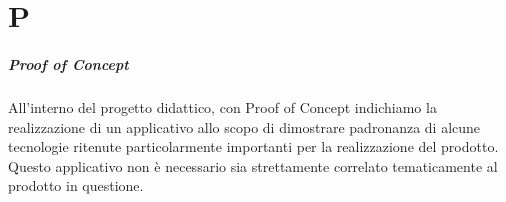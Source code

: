 \chapter{P}
\paragraph*{Proof of Concept}
All'interno del progetto didattico, con Proof of Concept indichiamo la realizzazione di un applicativo allo scopo di dimostrare padronanza di alcune tecnologie ritenute particolarmente importanti per la realizzazione del prodotto. Questo applicativo non è necessario sia strettamente correlato tematicamente al prodotto in questione.